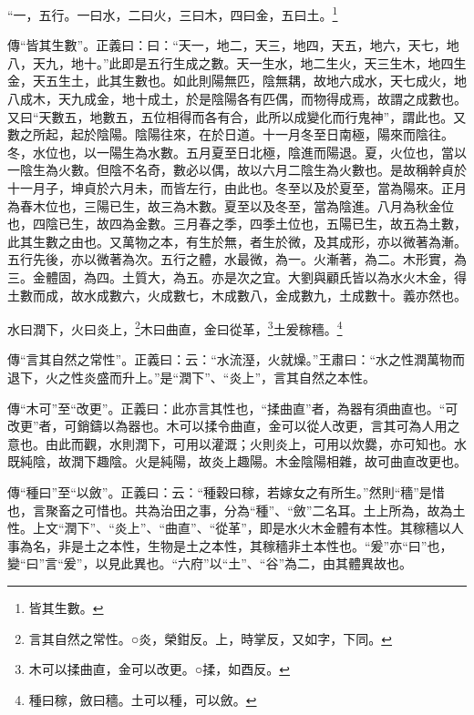 “一，五行。一曰水，二曰火，三曰木，四曰金，五曰土。\footnote{皆其生數。}


{\noindent\zhuan{}\fzbyks 傳“皆其生數”。正義曰：曰：“天一，地二，天三，地四，天五，地六，天七，地八，天九，地十。”此即是五行生成之數。天一生水，地二生火，天三生木，地四生金，天五生土，此其生數也。如此則陽無匹，陰無耦，故地六成水，天七成火，地八成木，天九成金，地十成土，於是陰陽各有匹偶，而物得成焉，故謂之成數也。又曰“天數五，地數五，五位相得而各有合，此所以成變化而行鬼神”，謂此也。又數之所起，起於陰陽。陰陽往來，在於日道。十一月冬至日南極，陽來而陰往。冬，水位也，以一陽生為水數。五月夏至日北極，陰進而陽退。夏，火位也，當以一陰生為火數。但陰不名奇，數必以偶，故以六月二陰生為火數也。是故稱幹貞於十一月子，坤貞於六月未，而皆左行，由此也。冬至以及於夏至，當為陽來。正月為春木位也，三陽已生，故三為木數。夏至以及冬至，當為陰進。八月為秋金位也，四陰已生，故四為金數。三月春之季，四季土位也，五陽已生，故五為土數，此其生數之由也。又萬物之本，有生於無，者生於微，及其成形，亦以微著為漸。五行先後，亦以微著為次。五行之體，水最微，為一。火漸著，為二。木形實，為三。金體固，為四。土質大，為五。亦是次之宜。大劉與顧氏皆以為水火木金，得土數而成，故水成數六，火成數七，木成數八，金成數九，土成數十。義亦然也。 \par}

水曰潤下，火曰炎上，\footnote{言其自然之常性。○炎，榮鉗反。上，時掌反，又如字，下同。}木曰曲直，金曰從革，\footnote{木可以揉曲直，金可以改更。○揉，如酉反。}土爰稼穡。\footnote{種曰稼，斂曰穡。土可以種，可以斂。}


{\noindent\zhuan{}\fzbyks 傳“言其自然之常性”。正義曰：云：“水流溼，火就燥。”王肅曰：“水之性潤萬物而退下，火之性炎盛而升上。”是“潤下”、“炎上”，言其自然之本性。 \par}

{\noindent\zhuan{}\fzbyks 傳“木可”至“改更”。正義曰：此亦言其性也，“揉曲直”者，為器有須曲直也。“可改更”者，可銷鑄以為器也。木可以揉令曲直，金可以從人改更，言其可為人用之意也。由此而觀，水則潤下，可用以灌溉；火則炎上，可用以炊爨，亦可知也。水既純陰，故潤下趣陰。火是純陽，故炎上趣陽。木金陰陽相雜，故可曲直改更也。 \par}

{\noindent\zhuan{}\fzbyks 傳“種曰”至“以斂”。正義曰：云：“種穀曰稼，若嫁女之有所生。”然則“穡”是惜也，言聚畜之可惜也。共為治田之事，分為“種”、“斂”二名耳。土上所為，故為土性。上文“潤下”、“炎上”、“曲直”、“從革”，即是水火木金體有本性。其稼穡以人事為名，非是土之本性，生物是土之本性，其稼穡非土本性也。“爰”亦“曰”也，變“曰”言“爰”，以見此異也。“六府”以“土”、“谷”為二，由其體異故也。 \par}

